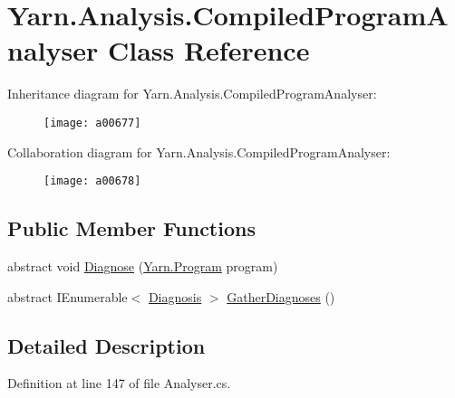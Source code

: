 \hypertarget{a00050}{\section{Yarn.\-Analysis.\-Compiled\-Program\-Analyser Class Reference}
\label{a00050}
}


Inheritance diagram for Yarn.\-Analysis.\-Compiled\-Program\-Analyser\-:
\nopagebreak
\begin{figure}[H]
\begin{center}
\leavevmode
\texttt{[image: a00677]}
\end{center}
\end{figure}


Collaboration diagram for Yarn.\-Analysis.\-Compiled\-Program\-Analyser\-:
\nopagebreak
\begin{figure}[H]
\begin{center}
\leavevmode
\texttt{[image: a00678]}
\end{center}
\end{figure}
\subsection*{Public Member Functions}
\begin{DoxyCompactItemize}
\item 
abstract void \hyperlink{a00050_aba4a36cb823b11ee491074e26477d084}{Diagnose} (\hyperlink{a00138}{Yarn.\-Program} program)
\item 
abstract I\-Enumerable$<$ \hyperlink{a00087}{Diagnosis} $>$ \hyperlink{a00050_afe059a2ceeabe50380b000420e512bd6}{Gather\-Diagnoses} ()
\end{DoxyCompactItemize}


\subsection{Detailed Description}


Definition at line 147 of file Analyser.\-cs.



